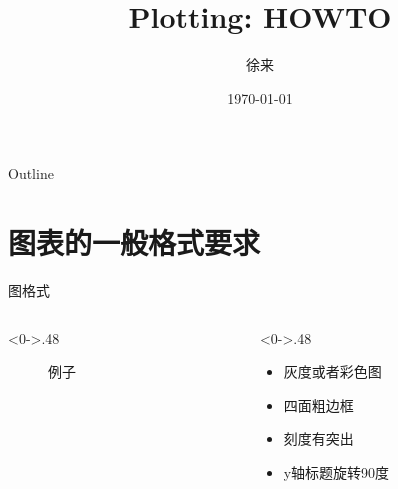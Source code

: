 \documentclass[utf8,dvipsnames,aspectratio=169]{beamer}
\title{Plotting: HOWTO}
\author{徐来}
\institute{%
	Wuhan University \\
	\pgfuseimage{whu-logo} %
}
\date{\today}
\begin{document}

\frame[plain]{\titlepage}

\begin{frame}{Outline}
  \tableofcontents
\end{frame}

\section{图表的一般格式要求}
\begin{frame}{图格式}
	\begin{columns}
	\begin{column}<0->{.48\textwidth}
		\begin{figure}[thpb]
			\centering
			\caption{例子}
			\label{fig:ex-fig}
		\end{figure}
	\end{column}
	\begin{column}<0->{.48\textwidth}
		\begin{itemize}
			\item<1-> 灰度或者彩色图
			\item<1-> 四面粗边框
			\item<1-> 刻度有突出
			\item<1-> y轴标题旋转90度
		\end{itemize}
	\end{column}
	\end{columns}
\end{frame}
\end{document}
